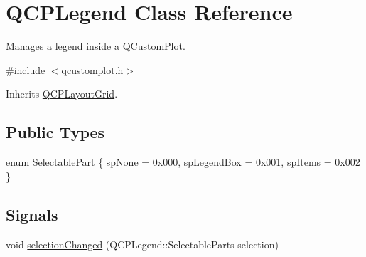 \hypertarget{class_q_c_p_legend}{\section{Q\-C\-P\-Legend Class Reference}
\label{class_q_c_p_legend}
}


Manages a legend inside a \hyperlink{class_q_custom_plot}{Q\-Custom\-Plot}.  




{\ttfamily \#include $<$qcustomplot.\-h$>$}



Inherits \hyperlink{class_q_c_p_layout_grid}{Q\-C\-P\-Layout\-Grid}.

\subsection*{Public Types}
\begin{DoxyCompactItemize}
\item 
enum \hyperlink{class_q_c_p_legend_a5404de8bc1e4a994ca4ae69e2c7072f1}{Selectable\-Part} \{ \hyperlink{class_q_c_p_legend_a5404de8bc1e4a994ca4ae69e2c7072f1a378201c07d500af7126e3ec91652eed7}{sp\-None} = 0x000, 
\hyperlink{class_q_c_p_legend_a5404de8bc1e4a994ca4ae69e2c7072f1a0fa4758962a46fa1dc9da818abae23c4}{sp\-Legend\-Box} = 0x001, 
\hyperlink{class_q_c_p_legend_a5404de8bc1e4a994ca4ae69e2c7072f1a768bfb95f323db4c66473375032c0af7}{sp\-Items} = 0x002
 \}
\end{DoxyCompactItemize}
\subsection*{Signals}
\begin{DoxyCompactItemize}
\item 
void \hyperlink{class_q_c_p_legend_a286149b644d5f5c884a0140219d979f6}{selection\-Changed} (Q\-C\-P\-Legend\-::\-Selectable\-Parts selection)
\end{DoxyCompactItemize}
